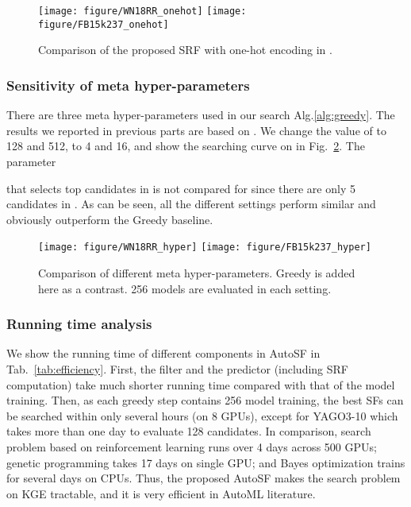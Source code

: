 \documentclass[conference]{IEEEtran}
\begin{document}
\begin{figure}[ht]
	\centering
	\vspace{-8px}
	\texttt{[image: figure/WN18RR\_onehot]}
	\quad
	\texttt{[image: figure/FB15k237\_onehot]}
	\vspace{-10px}
	\caption{Comparison of the proposed SRF with one-hot encoding in \cite{liu2018progressive}.}
	\label{fig:srf}
	\vspace{-5px}
\end{figure}

\subsubsection{Sensitivity of meta hyper-parameters}
\label{ssec:hyper}

There are three meta hyper-parameters  used in our search Alg.\ref{alg:greedy}.
The results we reported in previous parts are based on .
We change the value of  to 128 and 512,
 to 4 and 16, and show the searching curve on  in Fig.~\ref{fig:hyper}.
The parameter
 
that selects top candidates in 
is not compared for  since there are only 5 candidates in .
As can be seen,
all the different settings perform similar and obviously outperform the Greedy baseline.

\begin{figure}[ht]
	\centering
	\texttt{[image: figure/WN18RR\_hyper]}
	\quad
	\texttt{[image: figure/FB15k237\_hyper]}
	\vspace{-10px}
	\caption{Comparison of different meta hyper-parameters. 
		Greedy is added here as a contrast. 
		256 models are evaluated in each setting.}
	\label{fig:hyper}
	\vspace{-8px}
\end{figure}



{
\subsubsection{Running time analysis}
\label{ssec:time}

We show the running time of different components in AutoSF in 
Tab.~\ref{tab:efficiency}.
First, the filter and the predictor (including SRF computation) take
much shorter running time compared with that of the model training.
Then, 
as each greedy step contains 256 model training,
the best SFs can be searched within only several hours (on 8 GPUs), 
except for YAGO3-10
which takes more than one day to evaluate 128 candidates.
In comparison, 
search problem based on 
reinforcement learning \cite{zoph2017neural} runs over 4 days across 500 GPUs;
genetic programming \cite{xie2017genetic} takes 17 days on single GPU;
and Bayes optimization \cite{feurer2015efficient} trains for several days on CPUs.
Thus,
the proposed AutoSF makes the search problem on KGE tractable,
and it is very efficient in 
AutoML literature.
}
\end{document}
